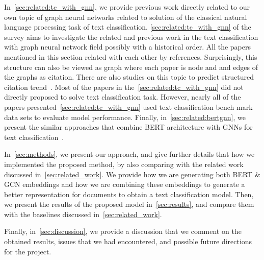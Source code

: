 In~\cref{sec:related:tc_with_gnn}, we provide previous work directly related to our own topic of graph neural networks related to solution of the classical natural language processing task of text classification. \cref{sec:related:tc_with_gnn} of the survey aims to investigate the related and previous work in the text classification with graph neural network field possibly with a historical order. All the papers mentioned in this section related with each other by references. Surprisingly, this structure can also be viewed as graph where each paper is node and and edges of the graphs as citation. There are also studies on this topic to predict structured citation trend~\autocite{citationGNN}. Most of the papers in the~\cref{sec:related:tc_with_gnn} did not directly proposed to solve text classification task. However, nearly all of the papers presented~\cref{sec:related:tc_with_gnn} used text classification bench mark data sets to evaluate model performance. Finally, in~\cref{sec:related:bertgnn}, we present the similar approaches that combine BERT architecture with GNNs for text classification~\autocite{zhibin2020vgcn,yang2021bertenhanced,lin2022bertgcn,she2022bertgcnattention,zeng2022boosting}.

In~\cref{sec:methods}, we present our approach, and give further details that how we implemented the proposed method, by also comparing with the related work discussed in~\cref{sec:related_work}. We provide how we are generating both BERT \& GCN embeddings and how we are combining these embeddings to generate a better representation for documents to obtain a text classification model. Then, we present the results of the proposed model in~\cref{sec:results}, and compare them with the baselines discussed in~\cref{sec:related_work}.

Finally, in~\cref{sec:discussion}, we provide a discussion that we comment on the obtained results, issues that we had encountered, and possible future directions for the project.
